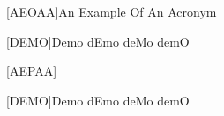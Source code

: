 [AEOAA]{An Example Of An Acronym}

[DEMO]{Demo dEmo deMo demO}

[AEPAA]{}

[DEMO]{Demo dEmo deMo demO}
